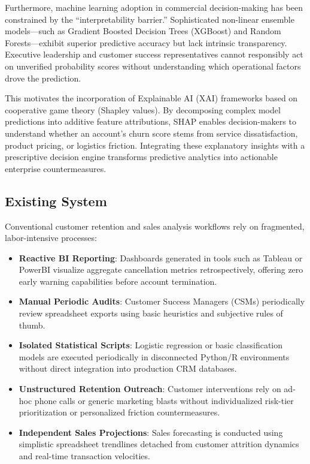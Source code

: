 \documentclass[12pt,a4paper]{article}
\begin{document}
Furthermore, machine learning adoption in commercial decision-making has been constrained by the ``interpretability barrier.'' Sophisticated non-linear ensemble models---such as Gradient Boosted Decision Trees (XGBoost) and Random Forests---exhibit superior predictive accuracy but lack intrinsic transparency. Executive leadership and customer success representatives cannot responsibly act on unverified probability scores without understanding which operational factors drove the prediction. 

This motivates the incorporation of Explainable AI (XAI) frameworks based on cooperative game theory (Shapley values). By decomposing complex model predictions into additive feature attributions, SHAP enables decision-makers to understand whether an account's churn score stems from service dissatisfaction, product pricing, or logistics friction. Integrating these explanatory insights with a prescriptive decision engine transforms predictive analytics into actionable enterprise countermeasures.

\subsection{Existing System}\label{sub:1.3}

Conventional customer retention and sales analysis workflows rely on fragmented, labor-intensive processes:
\begin{itemize}[leftmargin=20pt]
    \item \textbf{Reactive BI Reporting}: Dashboards generated in tools such as Tableau or PowerBI visualize aggregate cancellation metrics retrospectively, offering zero early warning capabilities before account termination.
    \item \textbf{Manual Periodic Audits}: Customer Success Managers (CSMs) periodically review spreadsheet exports using basic heuristics and subjective rules of thumb.
    \item \textbf{Isolated Statistical Scripts}: Logistic regression or basic classification models are executed periodically in disconnected Python/R environments without direct integration into production CRM databases.
    \item \textbf{Unstructured Retention Outreach}: Customer interventions rely on ad-hoc phone calls or generic marketing blasts without individualized risk-tier prioritization or personalized friction countermeasures.
    \item \textbf{Independent Sales Projections}: Sales forecasting is conducted using simplistic spreadsheet trendlines detached from customer attrition dynamics and real-time transaction velocities.
\end{itemize}
\end{document}
